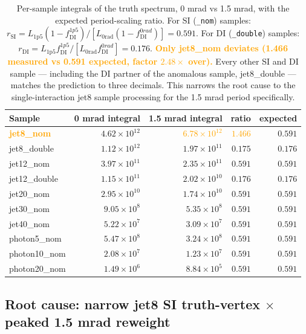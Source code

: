 \documentclass[11pt,a4paper]{article}
\newcommand{\warn}[1]{\textcolor{orange}{\textbf{#1}}}
\begin{document}
\begin{table}[H]
\centering
\begin{tabular}{lrrrr}
\toprule
Sample     & 0 mrad integral      & 1.5 mrad integral    & ratio   & expected \\
\midrule
\warn{jet8\_nom}   & $4.62\times10^{12}$  & \warn{$6.78\times10^{12}$}  & \warn{$1.466$} & $0.591$ \\
jet8\_double       & $1.12\times10^{12}$  & $1.97\times10^{11}$         & $0.175$ & $0.176$ \\
jet12\_nom         & $3.97\times10^{11}$  & $2.35\times10^{11}$         & $0.591$ & $0.591$ \\
jet12\_double      & $1.15\times10^{11}$  & $2.02\times10^{10}$         & $0.176$ & $0.176$ \\
jet20\_nom         & $2.95\times10^{10}$  & $1.74\times10^{10}$         & $0.591$ & $0.591$ \\
jet30\_nom         & $9.05\times10^{8}$   & $5.35\times10^{8}$          & $0.591$ & $0.591$ \\
jet40\_nom         & $5.22\times10^{7}$   & $3.09\times10^{7}$          & $0.591$ & $0.591$ \\
\midrule
photon5\_nom       & $5.47\times10^{8}$   & $3.24\times10^{8}$          & $0.591$ & $0.591$ \\
photon10\_nom      & $2.08\times10^{7}$   & $1.23\times10^{7}$          & $0.591$ & $0.591$ \\
photon20\_nom      & $1.49\times10^{6}$   & $8.84\times10^{5}$          & $0.591$ & $0.591$ \\
\bottomrule
\end{tabular}
\caption{Per-sample integrals of the truth spectrum, 0 mrad vs 1.5 mrad, with the expected period-scaling ratio. For SI (\texttt{\_nom}) samples: $r_{\mathrm{SI}} = L_{\mathrm{1p5}} (1-f_{\mathrm{DI}}^{1p5}) / [L_{\mathrm{0rad}} (1-f_{\mathrm{DI}}^{0rad})] = 0.591$. For DI (\texttt{\_double}) samples: $r_{\mathrm{DI}} = L_{\mathrm{1p5}} f_{\mathrm{DI}}^{1p5} / [L_{\mathrm{0rad}} f_{\mathrm{DI}}^{0rad}] = 0.176$. \warn{Only jet8\_nom deviates (1.466 measured vs 0.591 expected, factor $2.48\times$ over).} Every other SI and DI sample --- including the DI partner of the anomalous sample, jet8\_double --- matches the prediction to three decimals. This narrows the root cause to the single-interaction jet8 sample processing for the 1.5 mrad period specifically.}
\label{tab:jet_scaling_check}
\end{table}

\subsection{Root cause: narrow jet8 SI truth-vertex $\times$ peaked 1.5 mrad reweight}
\end{document}
